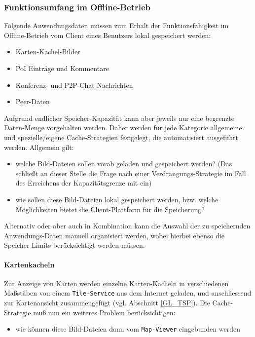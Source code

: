 \subsubsection{Funktionsumfang im Offline-Betrieb}
Folgende Anwendungsdaten müssen zum Erhalt der Funktionsfähigkeit im Offline-Betrieb vom Client eines Benutzers lokal gespeichert werden:
\begin{itemize}
  \item Karten-Kachel-Bilder
  \item PoI Einträge und Kommentare
  \item Konferenz- und P2P-Chat Nachrichten
  \item Peer-Daten
\end{itemize}
Aufgrund endlicher Speicher-Kapazität kann aber jeweils nur eine begrenzte Daten-Menge vorgehalten werden. Daher werden für jede Kategorie allgemeine und spezielle/eigene Cache-Strategien festgelegt, die automatisiert ausgeführt werden. Allgemein gilt:
	\begin{itemize}
		\item welche Bild-Dateien sollen vorab geladen und gespeichert werden? (Das schließt an dieser Stelle die Frage nach einer Verdrängungs-Strategie im Fall des Erreichens der Kapazitätsgrenze mit ein)%
		\item wie sollen diese Bild-Dateien lokal gespeichert werden, bzw. welche Möglichkeiten bietet die Client-Plattform für die Speicherung?%
	\end{itemize}
Alternativ oder aber auch in Kombination kann die Auswahl der zu speichernden Anwendungs-Daten manuell organisiert werden, wobei hierbei ebenso die Speicher-Limits berücksichtigt werden müssen.

\paragraph{Kartenkacheln}
Zur Anzeige von Karten werden einzelne Karten-Kacheln in verschiedenen Maßstäben von einem \texttt{Tile-Service} aus dem Internet geladen, und anschliessend zur Kartenansicht zusammengefügt (vgl. Abschnitt \ref{GL_TSP}). Die Cache-Strategie muß nun ein weiteres Problem berücksichtigen:
	\begin{itemize}
		\item wie können diese Bild-Dateien dann vom \texttt{Map-Viewer} eingebunden werden%
	\end{itemize}

